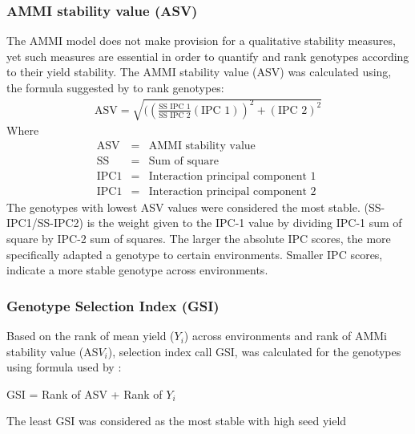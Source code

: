 \subsubsection{AMMI stability value (ASV)}
The AMMI model does not make provision for a qualitative  stability measures, yet such measures are essential in order to quantify and rank genotypes according to their yield stability. The AMMI stability value (ASV) was calculated using, the formula suggested by \citet{Purchase1997} to rank genotypes:
\begin{eqnarray}
\text{ASV} = \sqrt{((\frac{\text{SS IPC 1}}{\text{SS IPC 2}}(\text{IPC 1}))^2+(\text{IPC 2})^2} \nonumber
\end{eqnarray}
Where\\
\begin{eqnarray}
\text{ASV} &=& \text{AMMI stability value} \nonumber \\
\text{SS} &=& \text{Sum of square} \nonumber \\
\text{IPC1} &=& \text{Interaction principal component 1 } \nonumber\\
\text{IPC1} &=& \text{Interaction principal component 2 } \nonumber
\end{eqnarray}
The genotypes with lowest ASV values were considered the most stable. (SS-IPC1/SS-IPC2) is the weight given to the IPC-1 value by dividing IPC-1 sum of square by IPC-2 sum of squares. The larger the absolute IPC scores, the more specifically adapted a genotype to certain environments. Smaller IPC scores, indicate a more stable genotype across environments.

\subsubsection{Genotype Selection Index (GSI)}
Based on the rank of mean yield ($Y_i$) across environments and rank of AMMi stability value (AS$V_i$), selection index call GSI, was calculated for the genotypes using formula used by \citep{Farshadfar2008}: 
\begin{center}
	GSI = Rank of ASV + Rank of $Y_i$
\end{center}
The least GSI was considered as the most stable with high seed yield 




















